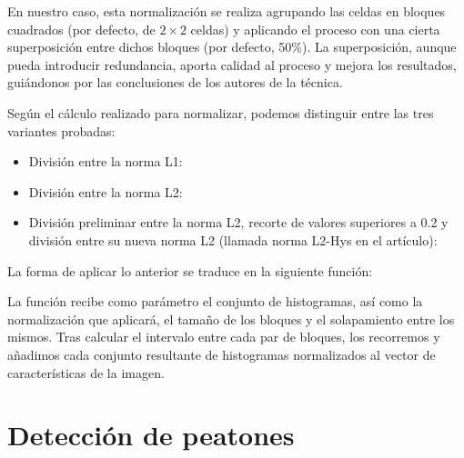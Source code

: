 \documentclass[11pt,a4paper]{article}
\begin{document}
            \par
            En nuestro caso, esta normalización se realiza agrupando las celdas en bloques cuadrados (por defecto, de $2\times2$ celdas) y aplicando el proceso con una cierta superposición entre dichos bloques (por defecto, 50\%). La superposición, aunque pueda introducir redundancia, aporta calidad al proceso y mejora los resultados, guiándonos por las conclusiones de los autores de la técnica.

            \par
            Según el cálculo realizado para normalizar, podemos distinguir entre las tres variantes probadas:

            \begin{itemize}

                \item
                División entre la norma L1:

                \item
                División entre la norma L2:

                \item
                División preliminar entre la norma L2, recorte de valores superiores a 0.2 y división entre su nueva norma L2 (llamada norma L2-Hys en el artículo):

            \end{itemize}

            \par
            La forma de aplicar lo anterior se traduce en la siguiente función:


            \par
            La función recibe como parámetro el conjunto de histogramas, así como la normalización que aplicará, el tamaño de los bloques y el solapamiento entre los mismos. Tras calcular el intervalo entre cada par de bloques, los recorremos y añadimos cada conjunto resultante de histogramas normalizados al vector de características de la imagen.

    \section{Detección de peatones}
\end{document}
